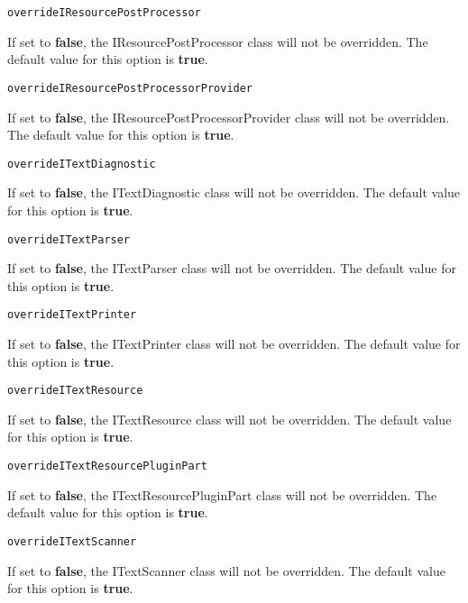\noindent\texttt{overrideIResourcePostProcessor}
\begin{myindentpar}{1cm}
If set to \textbf{false}, the IResourcePostProcessor class will not be overridden. The default value for this option is \textbf{true}.
\end{myindentpar}

\noindent\texttt{overrideIResourcePostProcessorProvider}
\begin{myindentpar}{1cm}
If set to \textbf{false}, the IResourcePostProcessorProvider class will not be overridden. The default value for this option is \textbf{true}.
\end{myindentpar}

\noindent\texttt{overrideITextDiagnostic}
\begin{myindentpar}{1cm}
If set to \textbf{false}, the ITextDiagnostic class will not be overridden. The default value for this option is \textbf{true}.
\end{myindentpar}

\noindent\texttt{overrideITextParser}
\begin{myindentpar}{1cm}
If set to \textbf{false}, the ITextParser class will not be overridden. The default value for this option is \textbf{true}.
\end{myindentpar}

\noindent\texttt{overrideITextPrinter}
\begin{myindentpar}{1cm}
If set to \textbf{false}, the ITextPrinter class will not be overridden. The default value for this option is \textbf{true}.
\end{myindentpar}

\noindent\texttt{overrideITextResource}
\begin{myindentpar}{1cm}
If set to \textbf{false}, the ITextResource class will not be overridden. The default value for this option is \textbf{true}.
\end{myindentpar}

\noindent\texttt{overrideITextResourcePluginPart}
\begin{myindentpar}{1cm}
If set to \textbf{false}, the ITextResourcePluginPart class will not be overridden. The default value for this option is \textbf{true}.
\end{myindentpar}

\noindent\texttt{overrideITextScanner}
\begin{myindentpar}{1cm}
If set to \textbf{false}, the ITextScanner class will not be overridden. The default value for this option is \textbf{true}.
\end{myindentpar}

